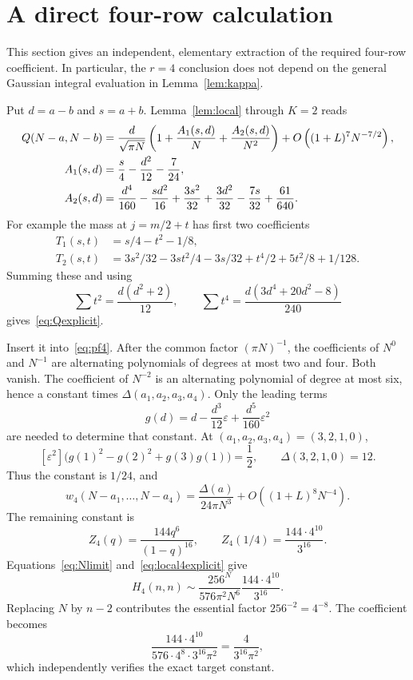 \documentclass[11pt]{article}
\theoremstyle{remark}
\begin{document}
\section{A direct four-row calculation}

This section gives an independent, elementary extraction of the required
four-row coefficient. In particular, the $r=4$ conclusion does not depend on
the general Gaussian integral evaluation in Lemma~\ref{lem:kappa}.

Put $d=a-b$ and $s=a+b$. Lemma~\ref{lem:local} through $K=2$ reads
\begin{align}
 Q(N-a,N-b)
 &=\frac d{\sqrt{\pi N}}
   \left(1+\frac{A_1(s,d)}{N}+\frac{A_2(s,d)}{N^2}\right)
 +O\left((1+L)^7N^{-7/2}\right),\label{eq:Qexplicit}\\
 A_1(s,d)&=\frac s4-\frac{d^2}{12}-\frac7{24},\notag\\
 A_2(s,d)&=\frac{d^4}{160}-\frac{sd^2}{16}
       +\frac{3s^2}{32}+\frac{3d^2}{32}-\frac{7s}{32}+\frac{61}{640}.\notag
\end{align}
For example the mass at $j=m/2+t$ has first two coefficients
\begin{align*}
 T_1(s,t)&=s/4-t^2-1/8,\\
 T_2(s,t)&=3s^2/32-3st^2/4-3s/32+t^4/2+5t^2/8+1/128.
\end{align*}
Summing these and using
\[
 \sum t^2=\frac{d(d^2+2)}{12},\qquad
 \sum t^4=\frac{d(3d^4+20d^2-8)}{240}
\]
gives~\eqref{eq:Qexplicit}.

Insert it into~\eqref{eq:pf4}. After the common factor $(\pi N)^{-1}$,
the coefficients of $N^0$ and $N^{-1}$ are alternating polynomials of degrees
at most two and four. Both vanish. The coefficient of $N^{-2}$ is an
alternating polynomial of degree at most six, hence a constant times
$\Delta(a_1,a_2,a_3,a_4)$. Only the leading terms
\[
 g(d)=d-\frac{d^3}{12}\varepsilon+\frac{d^5}{160}\varepsilon^2
\]
are needed to determine that constant. At $(a_1,a_2,a_3,a_4)=(3,2,1,0)$,
\[
 [\varepsilon^2]\bigl(g(1)^2-g(2)^2+g(3)g(1)\bigr)=\frac12,
 \qquad \Delta(3,2,1,0)=12.
\]
Thus the constant is $1/24$, and
\begin{equation}\label{eq:local4explicit}
 w_4(N-a_1,\ldots,N-a_4)
 =\frac{\Delta(a)}{24\pi N^3}
  +O\left((1+L)^8N^{-4}\right).
\end{equation}
The remaining constant is
\[
 Z_4(q)=\frac{144q^6}{(1-q)^{16}},\qquad
 Z_4(1/4)=\frac{144\cdot4^{10}}{3^{16}}.
\]
Equations~\eqref{eq:Nlimit} and~\eqref{eq:local4explicit} give
\[
 H_4(n,n)\sim\frac{256^N}{576\pi^2N^6}
                   \frac{144\cdot4^{10}}{3^{16}}.
\]
Replacing $N$ by $n-2$ contributes the essential factor
$256^{-2}=4^{-8}$. The coefficient becomes
\[
 \frac{144\cdot4^{10}}{576\cdot4^8\cdot3^{16}\pi^2}
 =\frac4{3^{16}\pi^2},
\]
which independently verifies the exact target constant.
\end{document}
